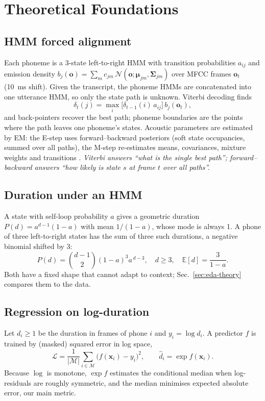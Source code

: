 \documentclass[conference]{IEEEtran}
\begin{document}
\section{Theoretical Foundations}\label{sec:theory}
\subsection{HMM forced alignment}
Each phoneme is a 3-state left-to-right HMM with transition probabilities $a_{ij}$ and emission density
$b_j(\mathbf{o})=\sum_{m}c_{jm}\,\mathcal{N}(\mathbf{o};\boldsymbol\mu_{jm},\boldsymbol\Sigma_{jm})$ over MFCC frames $\mathbf{o}_t$ (10~ms shift).
Given the transcript, the phoneme HMMs are concatenated into one utterance HMM, so only the state path is unknown. Viterbi decoding finds
\begin{equation}
\delta_t(j)=\max_i\big[\delta_{t-1}(i)\,a_{ij}\big]\,b_j(\mathbf{o}_t),
\end{equation}
and back-pointers recover the best path; phoneme boundaries are the points where the path leaves one phoneme's states.
Acoustic parameters are estimated by EM: the E-step uses forward--backward posteriors (soft state occupancies, summed over all paths), the M-step re-estimates means, covariances, mixture weights and transitions \cite{dempster1977,rabiner1989}.
\emph{Viterbi answers ``what is the single best path''; forward--backward answers ``how likely is state $s$ at frame $t$ over all paths''.}

\subsection{Duration under an HMM}
A state with self-loop probability $a$ gives a geometric duration $P(d)=a^{d-1}(1-a)$ with mean $1/(1-a)$, whose mode is always 1.
A phone of three left-to-right states has the sum of three such durations, a negative binomial shifted by 3:
\begin{equation}
P(d)=\binom{d-1}{2}(1-a)^3a^{\,d-3},\quad d\ge3,\quad \mathbb{E}[d]=\frac{3}{1-a}.
\end{equation}
Both have a fixed shape that cannot adapt to context; Sec.~\ref{sec:eda-theory} compares them to the data.

\subsection{Regression on log-duration}
Let $d_i\ge1$ be the duration in frames of phone $i$ and $y_i=\log d_i$. A predictor $f$ is trained by (masked) squared error in log space,
\begin{equation}
\mathcal{L}=\frac{1}{|\mathcal{M}|}\sum_{i\in\mathcal{M}}\big(f(\mathbf{x}_i)-y_i\big)^2,\qquad \hat d_i=\exp f(\mathbf{x}_i).
\end{equation}
Because $\log$ is monotone, $\exp f$ estimates the conditional median when log-residuals are roughly symmetric, and the median minimises expected absolute error, our main metric.
\end{document}
